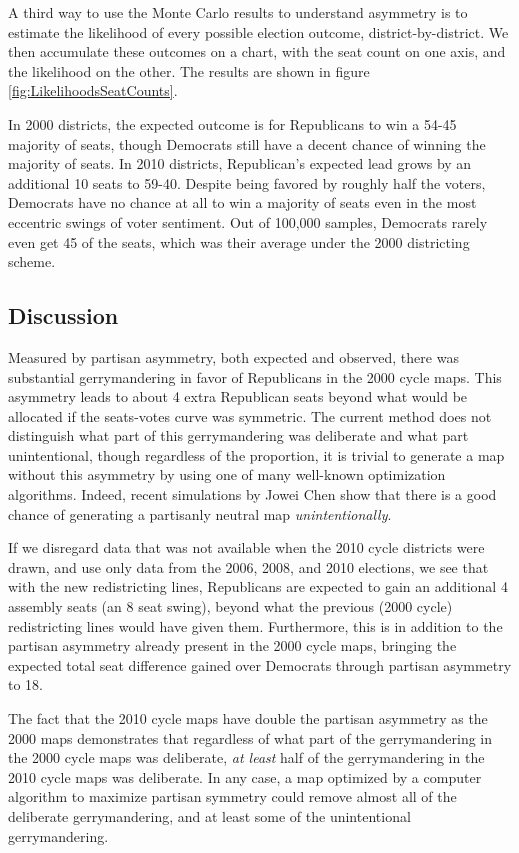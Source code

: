 \documentclass[preprint,12pt]{article}
\begin{document}
A third way to use the Monte Carlo results to understand asymmetry is to estimate the likelihood of every possible election outcome, district-by-district.
We then accumulate these outcomes on a chart, with the seat count on one axis, and the likelihood on the other.  The results are shown in figure \ref{fig:LikelihoodsSeatCounts}.

In 2000 districts, the expected outcome is for Republicans to win a 54-45 majority of seats, though Democrats still have a decent chance of winning the majority of seats. 
In 2010 districts, Republican's expected lead grows by an additional 10 seats to 59-40. 
Despite being favored by roughly half the voters, Democrats have no chance at all to win a majority of seats even in the most eccentric swings of voter sentiment.
Out of 100,000 samples, Democrats rarely even get 45 of the seats, which was their average under the 2000 districting scheme.

\subsection{Discussion}

Measured by partisan asymmetry, both expected and observed, there was substantial gerrymandering in favor of Republicans in the 2000 cycle maps.
This asymmetry leads to about 4 extra Republican seats beyond what would be allocated if the seats-votes curve was symmetric.
The current method does not distinguish what part of this gerrymandering was deliberate and what part unintentional, though regardless of the proportion, it is trivial to generate a map without this asymmetry by using one of many well-known optimization algorithms. 
Indeed, recent simulations by Jowei Chen \cite{Chen_2017_} show that there is a good chance of generating a partisanly neutral map \emph{unintentionally}.

If we disregard data that was not available when the 2010 cycle districts were drawn, and use only data from the 2006, 2008, and 2010 elections, we see that with the new redistricting lines, Republicans are expected to gain an additional 4 assembly seats (an 8 seat swing), beyond what the previous (2000 cycle) redistricting lines would have given them.
Furthermore, this is in addition to the partisan asymmetry already present in the 2000 cycle maps, bringing the expected total seat difference gained over Democrats through partisan asymmetry to 18.

The fact that the 2010 cycle maps have double the partisan asymmetry as the 2000 maps demonstrates that regardless of what part of the gerrymandering in the 2000 cycle maps was deliberate, \emph{at least} half of the gerrymandering in the 2010 cycle maps was deliberate.
In any case, a map optimized by a computer algorithm to maximize partisan symmetry could remove almost all of the deliberate gerrymandering, and at least some of the unintentional gerrymandering.
\end{document}
